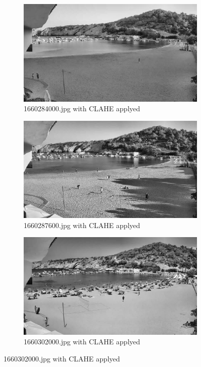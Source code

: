 \documentclass[11pt]{article}
\begin{document}
\begin{figure}[h]
    \centering %
\begin{subfigure}{0.25\textwidth}
  \includegraphics[width=\linewidth]{img/equ/1660284000.jpg}
  \caption{1660284000.jpg with CLAHE applyed}
  \label{fig:1}
\end{subfigure}\hfil %
\begin{subfigure}{0.25\textwidth}
  \includegraphics[width=\linewidth]{img/equ/1660287600.jpg}
  \caption{1660287600.jpg with CLAHE applyed}
  \label{fig:2}
\end{subfigure}\hfil %
\begin{subfigure}{0.25\textwidth}
  \includegraphics[width=\linewidth]{img/equ/1660302000.jpg}
  \caption{1660302000.jpg with CLAHE applyed}
  \label{fig:3}
\end{subfigure}


\end{figure}
\end{document}

